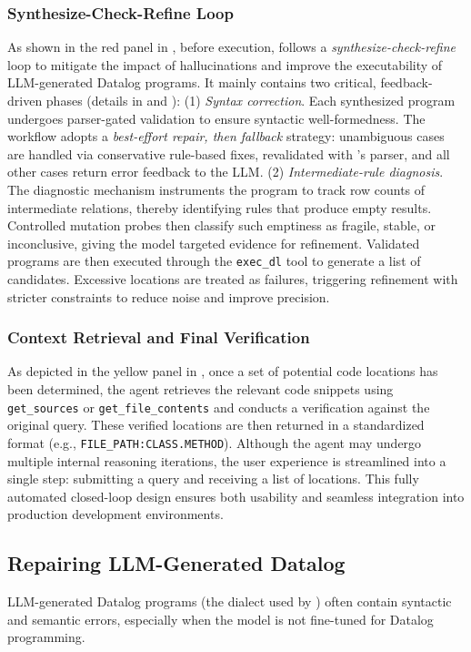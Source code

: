 \subsubsection{Synthesize-Check-Refine Loop}
As shown in the red panel in , before execution, \tooldataloc follows a \textit{synthesize-check-refine} loop to mitigate the impact of hallucinations and improve the executability of LLM-generated Datalog programs. It mainly contains two critical, feedback-driven phases (details in  and ): (1) \textit{Syntax correction}. Each synthesized program undergoes parser-gated validation to ensure syntactic well-formedness. The workflow adopts a \emph{best-effort repair, then fallback} strategy: unambiguous cases are handled via conservative rule-based fixes, revalidated with \souffle's parser, and all other cases return error feedback to the LLM. (2) \textit{Intermediate-rule diagnosis}. The diagnostic mechanism instruments the program to track row counts of intermediate relations, thereby identifying rules that produce empty results. Controlled mutation probes then classify such emptiness as fragile, stable, or inconclusive, giving the model targeted evidence for refinement. Validated programs are then executed through the \texttt{exec\_dl} tool to generate a list of candidates. Excessive locations are treated as failures, triggering refinement with stricter constraints to reduce noise and improve precision.

\subsubsection{Context Retrieval and Final Verification}
As depicted in the yellow panel in , once a set of potential code locations has been determined, the agent retrieves the relevant code snippets using \texttt{get\_sources} or \texttt{get\_file\_contents} and conducts a verification against the original query. These verified locations are then returned in a standardized format (e.g., \texttt{FILE\_PATH:CLASS.METHOD}). Although the agent may undergo multiple internal reasoning iterations, the user experience is streamlined into a single step: submitting a query and receiving a list of locations. This fully automated closed-loop design ensures both usability and seamless integration into production development environments.



\subsection{Repairing LLM-Generated Datalog}
\label{sec:method:val-dataloc}
LLM-generated Datalog programs (the dialect used by \souffle) often contain syntactic and semantic errors, especially when the model is not fine-tuned for Datalog programming.

